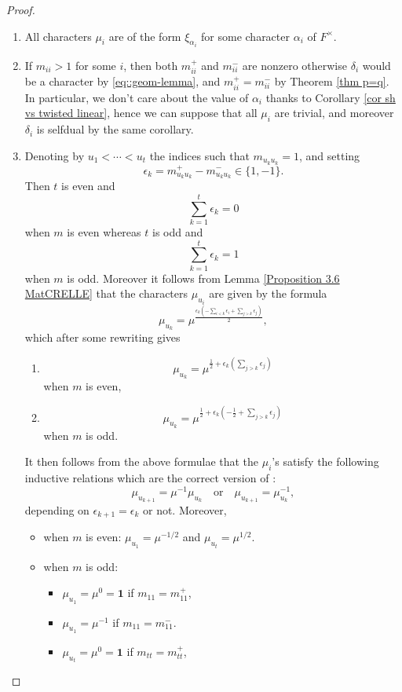 \documentclass[11pt,letterpaper]{amsart}
\newcommand{\triv}{{\mathbf{1}}}
\def\d{\delta}
\def\e{\epsilon}
\theoremstyle{plain}
\numberwithin{equation}{section}
\begin{document}
\begin{proof}
\begin{enumerate}
\item All characters $\mu_i$ are of the form $\xi_{\alpha_i}$ for some character $\alpha_i$ of $F^\times$.
\item\label{>1} If $m_{i i} > 1$ for some $i$, then both $m_{i i}^+$ and $m_{i i}^-$ are nonzero otherwise $\d_i$ would be a character by \eqref{eq::geom-lemma}, and $m_{i i}^+ = m_{i i}^-$ by Theorem \ref{thm p=q}. In particular, we don't care about the value of $\alpha_i$ thanks to Corollary \ref{cor sh vs twisted linear}, hence we can suppose that all $\mu_i$ are trivial, and moreover $\d_i$ is selfdual by the same corollary.
\item\label{=1} Denoting by $u_1<\cdots<u_t$ the indices such that $m_{u_k u_k} = 1 $, and setting \[\epsilon_k = m_{u_k u_k}^+ -  m_{u_k u_k}^- \in \{ 1, -1\}.\] Then $t$ is even and \[\sum_{k=1}^t \epsilon_k =0\] when $m$ is even whereas $t$ is odd and \[\sum_{k=1}^t \epsilon_k =1\] when $m$ is odd.  Moreover it follows from Lemma \ref{Proposition 3.6 MatCRELLE} that the characters $\mu_{u_i}$ are given by the formula 
\[\mu_{u_k}=\mu^{\frac{\e_k(-\sum_{i<k}\e_i+\sum_{j>k}\e_j)}{2}},\] which after some rewriting gives 
\begin{enumerate}
\item \[\mu_{u_k}=\mu^{\frac{1}{2}+\e_k(\sum_{j>k}\e_j)}\] when $m$ is even,
\item \[\mu_{u_k}=\mu^{\frac{1}{2}+\e_k(-\frac{1}{2}+\sum_{j>k}\e_j)}\] when $m$ is odd.
\end{enumerate}
 It then follows from the above formulae that the $\mu_i$'s satisfy the following inductive relations which are the correct version of \cite[Theorems 3.14, (2)]{MatCRELLE}:
 \begin{equation}\label{eq muui}
		\mu_{u_{k+1}} = \mu^{-1} \mu_{u_k} \quad \text{or}\quad \mu_{u_{k+1}} = \mu_{u_k}^{-1},
	\end{equation}
	depending on $\epsilon_{k+1} = \epsilon_k$ or not. Moreover,
	\begin{itemize}
	\item when $m$ is even: $\mu_{u_1} = \mu^{-1/2}$ and $\mu_{u_t} = \mu^{1/2}$. 
	\item when $m$ is odd: 
	\begin{itemize}
	\item $\mu_{u_1} = \mu^0=\triv$ if $m_{1 1}=m_{1 1}^+$,
	\item $\mu_{u_1} = \mu^{-1}$ if $m_{1 1}=m_{1 1}^-$.
	\item $\mu_{u_t} = \mu^0=\triv$ if $m_{t t}=m_{t t}^+$,

\end{itemize}
\end{itemize}
\end{enumerate}
\end{proof}
\end{document}
